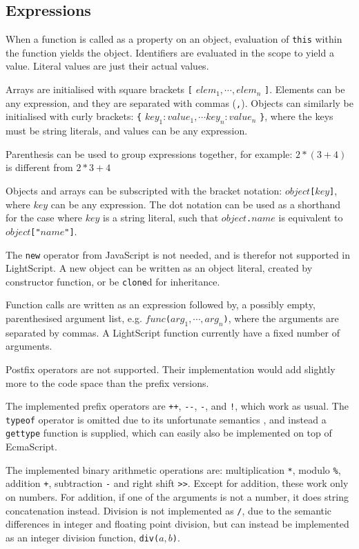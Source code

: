 \documentclass[11pt]{report}
\begin{document}
\subsection{Expressions}

When a function is called as a property on an object, evaluation of \verb|this| within the function yields the object.  Identifiers are evaluated in the scope to yield a value. Literal values are just their actual values.

Arrays are initialised with square brackets \verb|[| $elem_1,\cdots,elem_n$ \verb|]|. Elements can be any expression, and they are separated with commas (\verb|,|). 
Objects can similarly be initialised with curly brackets: \verb|{| 
$key_1: value_1, \cdots key_n: value_n$ \verb|}|, where the keys must be string literals, and values can be any expression.

Parenthesis can be used to group expressions together, for example: $2 * (3 + 4)$ is different from $2 * 3 + 4$

Objects and arrays can be subscripted with the bracket notation: $object$\verb|[|$key$\verb|]|, where $key$ can be any expression. The dot notation can be used as a shorthand for the case where $key$ is a string literal, such that $object$\verb|.|$name$ is equivalent to $object$\verb|["|$name$\verb|"]|.

The \verb|new| operator from JavaScript is not needed, and is therefor not supported in LightScript.
A new object can be written as an object literal, created by constructor function, or be \verb|clone|d for inheritance.

Function calls are written as an expression followed by, a possibly empty, parenthesised argument list, e.g. $func$\verb|(|$arg_1,\cdots,arg_n$\verb|)|, where the arguments are separated by commas. 
A LightScript function currently have a fixed number of arguments.

Postfix operators are not supported. Their implementation would add slightly more to the code space than the prefix versions.

The implemented prefix operators are \verb|++|, \verb|--|, \verb|-|, and \verb|!|, which work as usual. The \verb|typeof| operator is omitted due to its unfortunate semantics \cite{crockford-web}, and instead a \verb|gettype| function is supplied, which can easily also be implemented on top of EcmaScript.

The implemented binary arithmetic operations are: multiplication \verb|*|, modulo \verb|%|, addition \verb|+|, subtraction \verb|-| and right shift \verb|>>|. Except for addition, these work only on numbers. For addition, if one of the arguments is not a number, it does string concatenation instead.  Division \label{division} is not implemented as \verb|/|, due to the semantic differences in integer and floating point division, but can instead be implemented as an integer division function, \verb|div(|$a,b$\verb|)|. 
\end{document}
